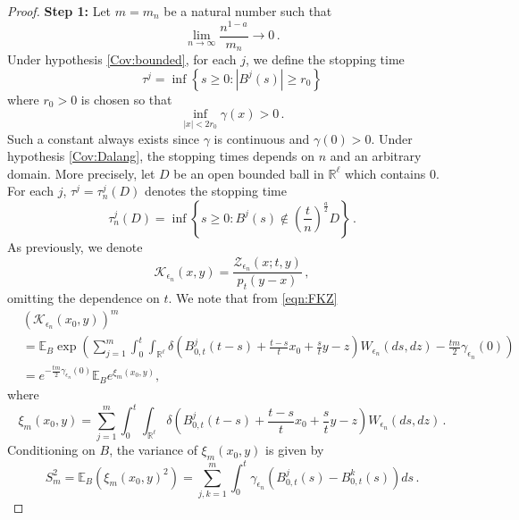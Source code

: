 \documentclass[12pt,reqno]{amsart}
\theoremstyle{remark}
\newcommand{\1}{\mathbf{1}}
\def\RR{\mathbb{R}}
\def\EE{\mathbb{E}}
\def\Z{\mathcal{Z}}
\def\K{\mathcal{K}}
\def\lt{\left}
\def\rt{\right}
\begin{document}
\begin{proof} 
	\textbf{Step 1:} 
		Let $m=m_n$ be a natural number such that 
		\begin{equation}\label{eq: m R}
			{\lim_{n\to \infty} \frac{n^{1-a}}{m_n} \to 0}\,. 
		\end{equation} 
		Under hypothesis \ref{Cov:bounded}, for each $j$, we define the stopping time 
		\begin{equation}\label{def.tau1}
			\tau^j=\inf\lt\{s\ge 0:|B^j(s)|\ge r_0  \rt\}
		\end{equation}
		where $r_0>0$ is chosen so that 
		\begin{equation}\label{def.r0}
			\inf_{|x|< 2 r_0}\gamma(x)>0\,.
		\end{equation}
		Such a constant always exists since $\gamma$ is continuous and $\gamma(0)>0$. Under hypothesis \ref{Cov:Dalang}, the stopping times depends on $n$ and an arbitrary domain. More precisely, let  $D$ be an open bounded ball in $\RR^\ell$ which contains 0. For each $j$, $\tau^j=\tau^j_n(D)$ denotes the stopping time
		\begin{equation}\label{def.tau2}
		  	\tau_n^j(D)=\inf\lt\{s\ge 0:B^j(s)\not\in \lt(\frac{t}{n}\rt)^{\frac a2}  D \rt\}\,.
		\end{equation}
		As previously, we denote
		\begin{equation*}
			\K_ {\epsilon_n}(x,y)=\frac{\Z_ {\epsilon_n}(x;t,y)}{p_t(y-x)}\,, 
		\end{equation*}
		omitting the dependence on $t$.
		We note that from \eqref{eqn:FKZ} 
		\begin{align*}
			&\left(\K_{\epsilon_n}(x_0,y) \right)^m 
			\\&= \EE_B \exp \left( \sum_{j=1}^m \int_0^t \int_{\RR^{\ell}} \delta\left(B_{0,t}^j(t-s)+\frac{t-s}{t}x_0 + \frac{s}{t}y-z\right)W_ {\epsilon_n}(ds,dz) - \frac{tm}{2}\gamma_ {\epsilon_n}(0) \right)\\
			&= e^{-\frac{tm}2 \gamma_ {\epsilon_n}(0)} \EE_B e^{\xi_m(x_0,y)}, 
		\end{align*}
		where 
		\begin{equation}
			\xi_m(x_0,y)=\sum_{j=1}^m \int_{0}^t \int_{\RR^{\ell}} \delta\left(B_{0,t}^j(t-s)+\frac{t-s}tx_0 + \frac{s}{t}y-z\right)W_ {\epsilon_n}(ds,dz)\,.
		\end{equation}
		Conditioning on $B$, the variance of $\xi_m(x_0,y)$ is given by 
		\begin{equation*}
			S_m^2=\EE_B (\xi_m(x_0,y)^2)= \sum_{j,k=1}^m\int_{0}^t \gamma_ {\epsilon_n}(B_{0,t}^j(s)-B_{0,t}^k(s))ds\,.

\end{equation*}
\end{proof}
\end{document}
